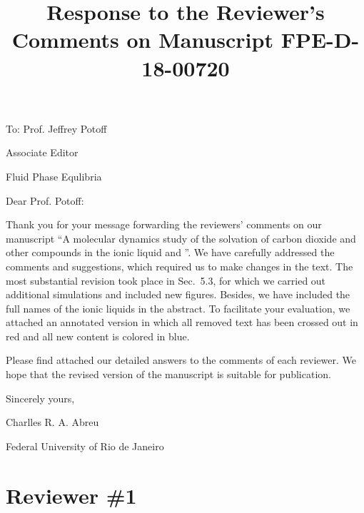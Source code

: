 \documentclass[]{article}
\title{\normalsize \textbf{Response to the Reviewer’s Comments on Manuscript FPE-D-18-00720}}
\author{}
\date{}
\begin{document}
\doublespacing
\maketitle

To: Prof. Jeffrey Potoff

Associate Editor

Fluid Phase Equlibria
\vspace{1cm}

Dear Prof. Potoff:

Thank you for your message forwarding the reviewers’ comments on our manuscript ``A molecular dynamics study of the solvation of carbon dioxide and other compounds in the ionic liquid \ce{[emim][B(CN)_4]} and \ce{[emim][NTf_2]}''.
We have carefully addressed the comments and suggestions, which required us to make changes in the text.
The most substantial revision took place in Sec.~5.3, for which we carried out additional simulations and included new figures.
Besides, we have included the full names of the ionic liquids in the abstract.
To facilitate your evaluation, we attached an annotated version in which all removed text has been crossed out in red and all new content is colored in blue.

Please find attached our detailed answers to the comments of each reviewer.
We
hope that the revised version of the manuscript is suitable for publication.

\begin{center}
Sincerely yours,
\end{center}
\begin{flushright}
Charlles R. A. Abreu

Federal University of Rio de Janeiro
\end{flushright}

\section{\textbf{Reviewer \#1}}
{}
\end{document}
